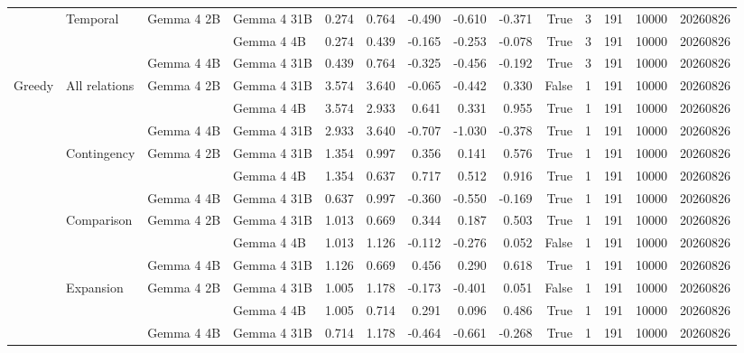 \begin{table}
\begin{tabular}{llllrrrrrrrrrr}
\cline{2-14} \cline{3-14}
 & \multirow[t]{3}{*}{Temporal} & \multirow[t]{2}{*}{Gemma 4 2B} & Gemma 4 31B & 0.274 & 0.764 & -0.490 & -0.610 & -0.371 & True & 3 & 191 & 10000 & 20260826 \\
 &  &  & Gemma 4 4B & 0.274 & 0.439 & -0.165 & -0.253 & -0.078 & True & 3 & 191 & 10000 & 20260826 \\
\cline{3-14}
 &  & Gemma 4 4B & Gemma 4 31B & 0.439 & 0.764 & -0.325 & -0.456 & -0.192 & True & 3 & 191 & 10000 & 20260826 \\
\cline{1-14} \cline{2-14} \cline{3-14}
\multirow[t]{15}{*}{Greedy} & \multirow[t]{3}{*}{All relations} & \multirow[t]{2}{*}{Gemma 4 2B} & Gemma 4 31B & 3.574 & 3.640 & -0.065 & -0.442 & 0.330 & False & 1 & 191 & 10000 & 20260826 \\
 &  &  & Gemma 4 4B & 3.574 & 2.933 & 0.641 & 0.331 & 0.955 & True & 1 & 191 & 10000 & 20260826 \\
\cline{3-14}
 &  & Gemma 4 4B & Gemma 4 31B & 2.933 & 3.640 & -0.707 & -1.030 & -0.378 & True & 1 & 191 & 10000 & 20260826 \\
\cline{2-14} \cline{3-14}
 & \multirow[t]{3}{*}{Contingency} & \multirow[t]{2}{*}{Gemma 4 2B} & Gemma 4 31B & 1.354 & 0.997 & 0.356 & 0.141 & 0.576 & True & 1 & 191 & 10000 & 20260826 \\
 &  &  & Gemma 4 4B & 1.354 & 0.637 & 0.717 & 0.512 & 0.916 & True & 1 & 191 & 10000 & 20260826 \\
\cline{3-14}
 &  & Gemma 4 4B & Gemma 4 31B & 0.637 & 0.997 & -0.360 & -0.550 & -0.169 & True & 1 & 191 & 10000 & 20260826 \\
\cline{2-14} \cline{3-14}
 & \multirow[t]{3}{*}{Comparison} & \multirow[t]{2}{*}{Gemma 4 2B} & Gemma 4 31B & 1.013 & 0.669 & 0.344 & 0.187 & 0.503 & True & 1 & 191 & 10000 & 20260826 \\
 &  &  & Gemma 4 4B & 1.013 & 1.126 & -0.112 & -0.276 & 0.052 & False & 1 & 191 & 10000 & 20260826 \\
\cline{3-14}
 &  & Gemma 4 4B & Gemma 4 31B & 1.126 & 0.669 & 0.456 & 0.290 & 0.618 & True & 1 & 191 & 10000 & 20260826 \\
\cline{2-14} \cline{3-14}
 & \multirow[t]{3}{*}{Expansion} & \multirow[t]{2}{*}{Gemma 4 2B} & Gemma 4 31B & 1.005 & 1.178 & -0.173 & -0.401 & 0.051 & False & 1 & 191 & 10000 & 20260826 \\
 &  &  & Gemma 4 4B & 1.005 & 0.714 & 0.291 & 0.096 & 0.486 & True & 1 & 191 & 10000 & 20260826 \\
\cline{3-14}
 &  & Gemma 4 4B & Gemma 4 31B & 0.714 & 1.178 & -0.464 & -0.661 & -0.268 & True & 1 & 191 & 10000 & 20260826 \\

\end{tabular}
\end{table}
